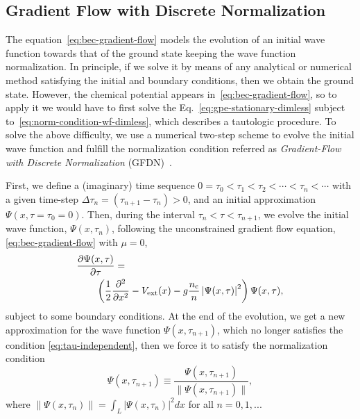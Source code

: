 \documentclass[twocolumn,showpacs,showkeys,preprintnumbers,superscriptaddress, pra, 10pt, aps]{revtex4-2}
\begin{document}
\subsection{Gradient Flow with Discrete Normalization}
The equation~\eqref{eq:bec-gradient-flow} models the evolution of an initial wave function towards that of
the ground state keeping the wave function normalization. In principle, if we solve it by
means of any analytical or numerical method satisfying the initial and boundary conditions, then we
obtain the ground state. However, the chemical potential appears in~\eqref{eq:bec-gradient-flow}, so
to apply it we would have to first solve the Eq.~\eqref{eq:gpe-stationary-dimless} subject
to~\eqref{eq:norm-condition-wf-dimless}, which describes a tautologic procedure. To solve the above
difficulty, we use a numerical two-step scheme to evolve the initial wave function and fulfill the
normalization condition referred as \emph{Gradient-Flow with Discrete
  Normalization} (GFDN)~\cite{bib:bao-2004}.

First, we define a (imaginary) time sequence $0 = \tau_0 < \tau_1 < \tau_2 < \cdots < \tau_n <
  \cdots$ with a given time-step $\Delta \tau_n = (\tau_{n+1} - \tau_n) > 0$, and an initial
approximation $\Psi(x, \tau = \tau_0 = 0)$. Then, during the interval $\tau_n < \tau < \tau_{n+1}$,
we evolve the initial wave function, $\Psi(x, \tau_n)$, following the unconstrained gradient flow
equation, \eqref{eq:bec-gradient-flow} with $\mu=0$,
%
\begin{align}
  \nonumber
   & \frac{\partial \Psi(x, \tau)}{\partial \tau} =                                                                                                                \\
  \label{eq:bec-gradient-flow-no-constraint}
   & \qquad \left( \frac{1}{2} \frac{\partial^2}{\partial x^2} - V_\mathrm{ext}(x) - g \frac{n_{\mathrm{c}}}{n} \left| \Psi(x, \tau) \right|^2 \right) \Psi(x, \tau),
\end{align}
%
subject to some boundary conditions. At the end of the evolution, we get a new approximation for the
wave function $\Psi(x, \tau_{n+1})$, which no longer satisfies the condition \eqref{eq:tau-independent}, then we force it to satisfy the normalization condition
%
\begin{equation}
  \label{eq:discrete-normalization}
  \Psi(x, \tau_{n+1}) \equiv \frac{\Psi(x, \tau_{n+1})}{\lVert \Psi(x, \tau_{n+1}) \rVert},
\end{equation}
%
where $\lVert \Psi(x, \tau_{n}) \rVert = \int_{L} \left|\Psi(x, \tau_n) \right|^2 dx$ for all $n=0, 1, ...$
\end{document}
